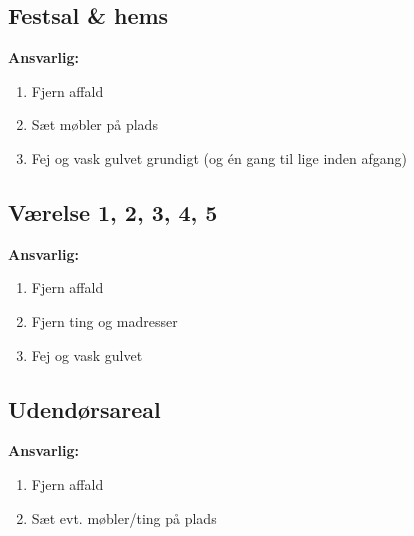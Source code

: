 \subsection{Festsal \& hems}
\textbf{Ansvarlig: \Gabriel}
\begin{multicols}{2}
\begin{enumerate}
  \item Fjern affald
  \item Sæt møbler på plads
  \item Fej og vask gulvet grundigt (og én gang til lige inden afgang)
\end{enumerate}
\end{multicols}

\subsection{Værelse 1, 2, 3, 4, 5}
\textbf{Ansvarlig: \BIATCH}
\begin{multicols}{2}
\begin{enumerate}
  \item Fjern affald
  \item Fjern ting og madresser
  \item Fej og vask gulvet
\end{enumerate}
\end{multicols}

\subsection{Udendørsareal}
\textbf{Ansvarlig: \KABS}
\begin{multicols}{2}
\begin{enumerate}
  \item Fjern affald
  \item Sæt evt. møbler/ting på plads
\end{enumerate}
\end{multicols}
